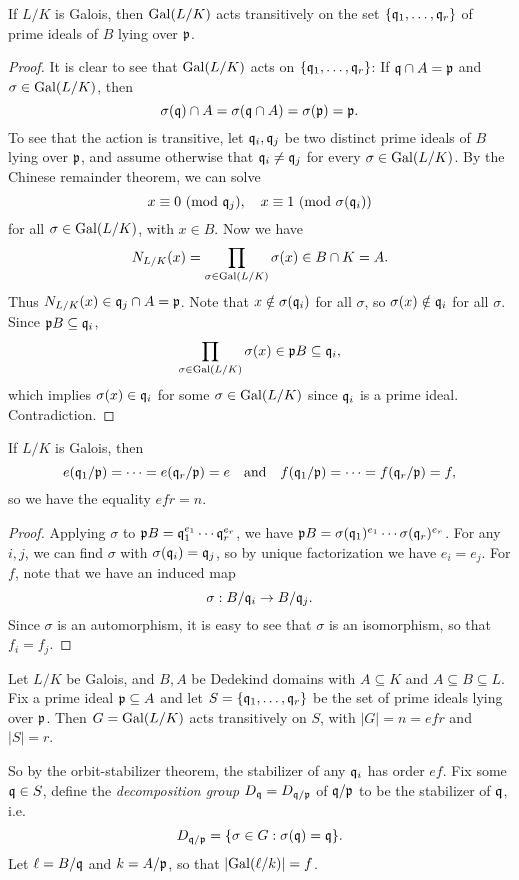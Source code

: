 \begin{prop}
  If $L / K$ is Galois, then $\operatorname{Gal}(L / K)$ acts
  transitively on the set $\{\mathfrak{q}_1, \dots, \mathfrak{q}_r\}$
  of prime ideals of $B$ lying over $\mathfrak{p}$.
\end{prop}

\begin{proof}
  It is clear to see that $\operatorname{Gal}(L / K)$ acts on
  $\{\mathfrak{q}_1, \dots, \mathfrak{q}_r\}$: If
  $\mathfrak{q} \cap A = \mathfrak{p}$ and $\sigma \in \operatorname{Gal}(L / K)$,
  then
  \[\sigma(\mathfrak{q}) \cap A = \sigma(\mathfrak{q} \cap A) = \sigma(\mathfrak{p}) = \mathfrak{p}.\]
  To see that the action is transitive, let
  $\mathfrak{q}_i, \mathfrak{q}_j$ be two distinct prime ideals of $B$ lying
  over $\mathfrak{p}$, and assume otherwise that
  $\mathfrak{q}_i \ne \mathfrak{q}_j$ for every $\sigma \in \operatorname{Gal}(L / K)$.
  By the Chinese remainder theorem, we can solve
  \[
    x \equiv 0 \ (\mathrm{mod}\ \mathfrak{q}_j), \quad x \equiv 1 \ (\mathrm{mod}\ \sigma(\mathfrak{q}_i))
  \]
  for all $\sigma \in \operatorname{Gal}(L / K)$, with $x \in B$.
  Now we have
  \[
    N_{L / K}(x) = \prod_{\sigma \in \operatorname{Gal}(L / K)} \sigma(x)
    \in B \cap K = A.
  \]
  Thus $N_{L / K}(x) \in \mathfrak{q}_j \cap A = \mathfrak{p}$. Note that
  $x \notin \sigma(\mathfrak{q}_i)$ for all $\sigma$, so
  $\sigma(x) \notin \mathfrak{q}_i$ for all $\sigma$.
  Since $\mathfrak{p} B \subseteq \mathfrak{q}_i$,
  \[
    \prod_{\sigma \in \operatorname{Gal}(L / K)} \sigma(x) \in \mathfrak{p} B
    \subseteq \mathfrak{q}_i,
  \]
  which implies $\sigma(x) \in \mathfrak{q}_i$ for some
  $\sigma \in \operatorname{Gal}(L / K)$ since $\mathfrak{q}_i$ is a prime ideal.
  Contradiction.
\end{proof}

\begin{corollary}
  If $L / K$ is Galois, then
  \[
    e(\mathfrak{q}_1 / \mathfrak{p}) = \cdots = e(\mathfrak{q}_r / \mathfrak{p}) = e \quad \text{and} \quad
    f(\mathfrak{q}_1 / \mathfrak{p}) = \cdots = f(\mathfrak{q}_r / \mathfrak{p}) = f,
  \]
  so we have the equality $efr = n$.
\end{corollary}

\begin{proof}
  Applying $\sigma$ to $\mathfrak{p} B = \mathfrak{q}_1^{e_1} \cdots \mathfrak{q}_r^{e_r}$,
  we have $\mathfrak{p} B = \sigma(\mathfrak{q}_1)^{e_1} \cdots \sigma(\mathfrak{q}_r)^{e_r}$.
  For any $i, j$, we can find $\sigma$ with $\sigma(\mathfrak{q}_i) = \mathfrak{q}_j$,
  so by unique factorization we have $e_i = e_j$.
  For $f$, note that we have an induced map
  \[
    \sigma : B / \mathfrak{q}_i \to B / \mathfrak{q}_j.
  \]
  Since $\sigma$ is an automorphism, it is easy to
  see that $\sigma$ is an isomorphism, so that
  $f_i = f_j$.
\end{proof}

\begin{remark}
  Let $L / K$ be Galois, and $B, A$ be Dedekind
  domains with $A \subseteq K$ and $A \subseteq B \subseteq L$.
  Fix a prime ideal $\mathfrak{p} \subseteq A$ and let
  $S = \{\mathfrak{q}_1, \dots, \mathfrak{q}_r\}$ be the set of prime
  ideals lying over $\mathfrak{p}$. Then $G = \operatorname{Gal}(L / K)$ acts
  transitively on $S$, with $|G| = n = efr$ and
  $|S| = r$.

  So by the orbit-stabilizer theorem,
  the stabilizer of any $\mathfrak{q}_i$ has order $ef$.
  Fix some $\mathfrak{q} \in S$, define the
  \emph{decomposition group} $D_{\mathfrak{q}} = D_{\mathfrak{q} / \mathfrak{p}}$
  of $\mathfrak{q} / \mathfrak{p}$ to be the stabilizer of $\mathfrak{q}$, i.e.
  \[
    D_{\mathfrak{q} / \mathfrak{p}} = \{\sigma \in G : \sigma(\mathfrak{q}) = \mathfrak{q}\}.
  \]
  Let $\ell = B / \mathfrak{q}$ and $k = A / \mathfrak{p}$, so that
  $|{\operatorname{Gal}(\ell / k)}| = f$.
\end{remark}

